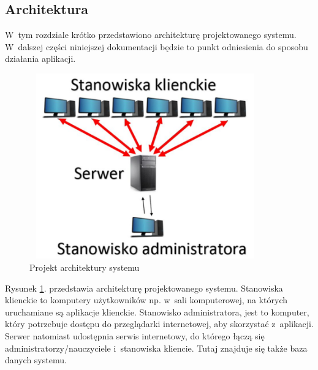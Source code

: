 \subsection{Architektura}

W~tym rozdziale krótko przedstawiono architekturę projektowanego systemu. W~dalszej części niniejszej dokumentacji będzie to punkt odniesienia do sposobu działania aplikacji.

\begin{figure} [!ht]
    \centering
    \includegraphics[height=8cm,width=10cm]{architektura}
    \caption{Projekt architektury systemu}
    \label{fig:architektura}
\end{figure}

Rysunek \ref{fig:architektura}. przedstawia architekturę projektowanego systemu. Stanowiska klienckie to komputery użytkowników np. w~sali komputerowej, na których uruchamiane są aplikacje klienckie. Stanowisko administratora, jest to komputer, który potrzebuje dostępu do przeglądarki internetowej, aby skorzystać z~aplikacji. Serwer natomiast udostępnia serwis internetowy, do którego łączą się administratorzy/nauczyciele i~stanowiska kliencie. Tutaj znajduje się także baza danych systemu.